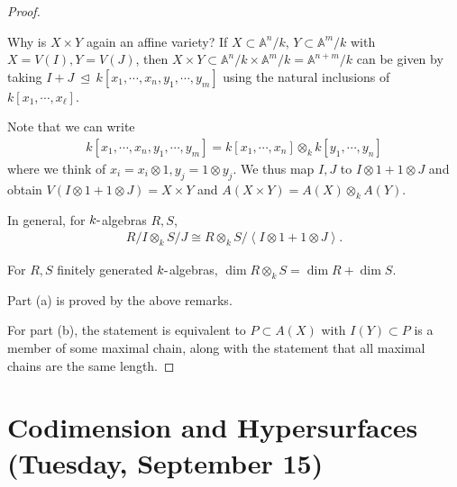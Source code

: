 \begin{proof}

\begin{remark}

Why is \(X\times Y\) again an affine variety? If
\(X\subset {\mathbb{A}}^n/k\), \(Y\subset {\mathbb{A}}^m/k\) with
\(X = V(I), Y = V(J)\), then
\(X\times Y \subset {\mathbb{A}}^n/k \times{\mathbb{A}}^m/k = {\mathbb{A}}^{n+m}/k\)
can be given by taking
\(I+J {~\trianglelefteq~}k[x_1, \cdots, x_n, y_1, \cdots, y_m]\) using
the natural inclusions of \(k[x_1, \cdots, x_{\ell}]\).

Note that we can write
\begin{align*}  
k[x_1, \cdots, x_n, y_1, \cdots, y_m] = k[x_1, \cdots, x_{n}] \otimes_k k[y_1, \cdots, y_n]
\end{align*}
where we think of \(x_i = x_i \otimes 1, y_j = 1 \otimes y_j\). We thus
map \(I, J\) to \(I\otimes 1 + 1\otimes J\) and obtain
\(V(I\otimes 1 + 1\otimes J) = X\times Y\) and
\(A(X\times Y) = A(X)\otimes_k A(Y)\).

In general, for \(k{\hbox{-}}\)algebras \(R,S\),
\begin{align*}  
R/I \otimes_k S/J \cong R\otimes_k S / \left\langle{I\otimes 1 + 1\otimes J}\right\rangle
.\end{align*}

\end{remark}

\begin{remark}

For \(R,S\) finitely generated \(k{\hbox{-}}\)algebras,
\(\dim R\otimes_k S = \dim R + \dim S\).

\end{remark}

Part (a) is proved by the above remarks.

For part (b), the statement is equivalent to \(P\subset A(X)\) with
\(I(Y) \subset P\) is a member of some maximal chain, along with the
statement that all maximal chains are the same length.

\end{proof}

\hypertarget{codimension-and-hypersurfaces-tuesday-september-15}{%
\section{Codimension and Hypersurfaces (Tuesday, September
15)}\label{codimension-and-hypersurfaces-tuesday-september-15}}

